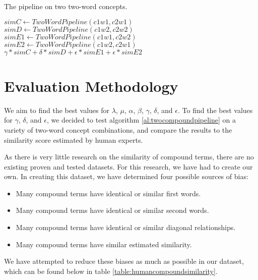 \documentclass{article}
\begin{document}
\begin{algorithm}
\caption{The pipeline on two two-word concepts.}\label{al:twocompoundpipeline}
\begin{algorithmic}[1]
		\State $\textit{simC} \gets \textit{TwoWordPipeline}(c1w1, c2w1)$
		\State $\textit{simD} \gets \textit{TwoWordPipeline}(c1w2, c2w2)$
		\State $\textit{simE1} \gets \textit{TwoWordPipeline}(c1w1, c2w2)$
		\State $\textit{simE2} \gets \textit{TwoWordPipeline}(c1w2, c2w1)$
		\State \Return $\gamma * \textit{simC} + \delta * \textit{simD} + \epsilon * \textit{simE1} + \epsilon * \textit{simE2}$
	\EndProcedure
\end{algorithmic}
\end{algorithm}

\section{Evaluation Methodology} \label{sec:evalmeth}

We aim to find the best values for $\lambda$, $\mu$, $\alpha$, $\beta$, $\gamma$, $\delta$, and $\epsilon$. To find the best values for $\gamma$, $\delta$, and $\epsilon$, we decided to test algorithm \ref{al:twocompoundpipeline} on a variety of two-word concept combinations, and compare the results to the similarity score estimated by human experts.

As there is very little research on the similarity of compound terms, there are no existing proven and tested datasets. For this research, we have had to create our own. In creating this dataset, we have determined four possible sources of bias:
\begin{itemize}
	\item Many compound terms have identical or similar first words.
	\item Many compound terms have identical or similar second words.
	\item Many compound terms have identical or similar diagonal relationships.
	\item Many compound terms have similar estimated similarity.
\end{itemize}
We have attempted to reduce these biases as much as possible in our dataset, which can be found below in table \ref{table:humancompoundsimilarity}.
\end{document}
